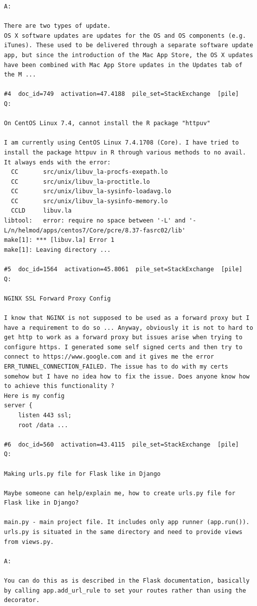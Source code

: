 \begin{verbatim}
A:

There are two types of update.
OS X software updates are updates for the OS and OS components (e.g. iTunes). These used to be delivered through a separate software update app, but since the introduction of the Mac App Store, the OS X updates have been combined with Mac App Store updates in the Updates tab of the M ...

#4  doc_id=749  activation=47.4188  pile_set=StackExchange  [pile]
Q:

On CentOS Linux 7.4, cannot install the R package "httpuv"

I am currently using CentOS Linux 7.4.1708 (Core). I have tried to install the package httpuv in R through various methods to no avail. It always ends with the error:
  CC       src/unix/libuv_la-procfs-exepath.lo
  CC       src/unix/libuv_la-proctitle.lo
  CC       src/unix/libuv_la-sysinfo-loadavg.lo
  CC       src/unix/libuv_la-sysinfo-memory.lo
  CCLD     libuv.la
libtool:   error: require no space between '-L' and '-L/n/helmod/apps/centos7/Core/pcre/8.37-fasrc02/lib'
make[1]: *** [libuv.la] Error 1
make[1]: Leaving directory ...

#5  doc_id=1564  activation=45.8061  pile_set=StackExchange  [pile]
Q:

NGINX SSL Forward Proxy Config

I know that NGINX is not supposed to be used as a forward proxy but I have a requirement to do so ... Anyway, obviously it is not to hard to get http to work as a forward proxy but issues arise when trying to configure https. I generated some self signed certs and then try to connect to https://www.google.com and it gives me the error ERR_TUNNEL_CONNECTION_FAILED. The issue has to do with my certs somehow but I have no idea how to fix the issue. Does anyone know how to achieve this functionality ?
Here is my config
server {
    listen 443 ssl;
    root /data ...

#6  doc_id=560  activation=43.4115  pile_set=StackExchange  [pile]
Q:

Making urls.py file for Flask like in Django

Maybe someone can help/explain me, how to create urls.py file for Flask like in Django?

main.py - main project file. It includes only app runner (app.run()).
urls.py is situated in the same directory and need to provide views
from views.py.

A:

You can do this as is described in the Flask documentation, basically by calling app.add_url_rule to set your routes rather than using the decorator.




\end{verbatim}
